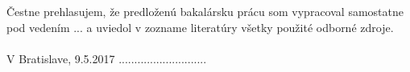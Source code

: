 
\newpage
\thispagestyle{plain}
\vspace*{13cm} 
\begin{large}
\noindent
\ifenglish
	\textbf{\Decl} \\
\else
	\textbf{\Declsk} \\
\fi
\end{large}
\noindent
Čestne prehlasujem, že predloženú bakalársku prácu som vypracoval samostatne pod vedením
... a uviedol v zozname literatúry všetky použité odborné zdroje.\\
\vspace*{0.5cm}\\
V Bratislave, 9.5.2017
\hspace*{7cm}............................\\
\hspace*{10.8cm} \Author